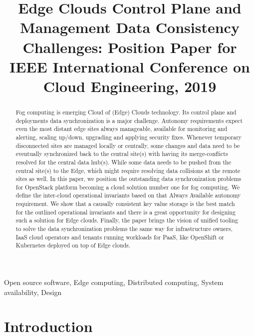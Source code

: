 \documentclass[conference]{IEEEtran}
\begin{document}
\title{Edge Clouds Control Plane and Management Data Consistency
Challenges: Position Paper for IEEE International Conference on Cloud
Engineering, 2019\\ }

\author{
}

\maketitle

\begin{abstract}
Fog computing is emerging Cloud of (Edge) Clouds technology. Its control plane
and deployments data synchronization is a major challenge. Autonomy requirements
expect even the most distant edge sites always manageable, available for
monitoring and alerting, scaling up/down, upgrading and applying security fixes.
Whenever temporary disconnected sites are managed locally or centrally, some
changes and data need to be eventually synchronized back to the central site(s)
with having its merge-conflicts resolved for the central data hub(s). While
some data needs to be pushed from the central site(s) to the Edge, which might
require resolving data collisions at the remote sites as well. In this paper,
we position the outstanding data synchronization problems for OpenStack
platform becoming a cloud solution number one for fog computing. We define the
inter-cloud operational invariants based on that Always Available autonomy
requirement. We show that a causally consistent key value storage is the best
match for the outlined operational invariants and there is a great opportunity
for designing such a solution for Edge clouds. Finally, the paper brings the
vision of unified tooling to solve the data synchronization problems the same
way for infrastructure owners, IaaS cloud operators and tenants running
workloads for PaaS, like OpenShift or Kubernetes deployed on top of Edge
clouds.
\end{abstract}

\begin{IEEEkeywords}
Open source software, Edge computing, Distributed computing, System
availability, Design
\end{IEEEkeywords}

\section{Introduction}
\end{document}
